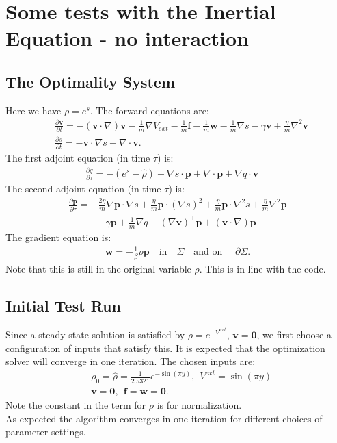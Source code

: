 \documentclass[11pt, a4paper]{article}
\theoremstyle{definition}
\newcommand{\Sta}{\rho}
\newcommand{\Stav}{\mathbf{v}}
\newcommand{\Adja}{\mathbf{p}}
\newcommand{\Adjb}{q}
\newcommand{\Con}{\mathbf{f}}
\begin{document}
	
\section{Some tests with the Inertial Equation - no interaction}
\subsection{The Optimality System}
    Here we have $\rho = e^s$. 
	The forward equations are:
	\begin{align*}
	& \frac{\partial \Stav}{\partial t}= -  (\Stav \cdot \nabla)\Stav - \frac{1}{m} \nabla V_{ext} -\frac{1}{m}\Con -\frac{1}{m} \mathbf{w} - \frac{1}{m} \nabla s - \gamma \Stav +  \frac{\eta}{m} \nabla^2 \Stav \\
	&\frac{\partial s}{\partial t} = - \Stav \cdot \nabla s - \nabla \cdot \Stav  .
	\end{align*}
	The first adjoint equation (in time $\tau$) is:
	\begin{align*}
	& \frac{\partial \Adjb}{\partial \tau} = - (e^s - \hat \rho)  + \nabla s \cdot \Adja + \nabla\cdot \Adja  +  \nabla \Adjb \cdot \Stav   \qquad 
	\end{align*}
	The second adjoint equation (in time $\tau$) is:
	\begin{align*}
	\frac{\partial \Adja}{\partial \tau} =& 
	\frac{2 \eta}{m} \nabla \Adja \cdot \nabla s + \frac{\eta}{m} \Adja \cdot (\nabla s)^2 + \frac{\eta}{m} \Adja \cdot \nabla^2 s + \frac{\eta}{m} \nabla^2 \Adja \\
	&  -\gamma  \Adja + \frac{1}{m} \nabla \Adjb - (\nabla \Stav)^\top\Adja + (\Stav \cdot \nabla)\Adja
	\end{align*}
	The gradient equation is:
	\begin{align*}
	\mathbf{w} = - \frac{1}{\beta} \Sta \Adja \quad \text{in} \quad \Sigma \quad \text{and on } \quad \partial\Sigma.
	\end{align*}
	Note that this is still in the original variable $\rho$. This is in line with the code.
	
\subsection{Initial Test Run}
   Since a steady state solution is satisfied by $\Sta = e^{-V^{ext}}$, $\Stav = \mathbf{0}$, we first choose a configuration of inputs that satisfy this. It is expected that the optimization solver will converge in one iteration.
   The chosen inputs are:
   \begin{align*}
   &\Sta_0 = \hat \Sta =  \frac{1}{2.5321}e^{-\sin(\pi y)}, \ \ V^{ext} = \sin(\pi y)\\
   &\Stav = \mathbf{0}, \ \ \Con = \mathbf{w} = \mathbf{0}.\ \ 
   \end{align*}
   Note the constant in the term for $\rho$ is for normalization.\\
   As expected the algorithm converges in one iteration for different choices of parameter settings.
\end{document}
